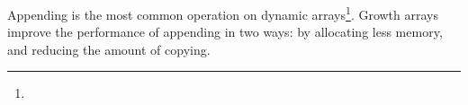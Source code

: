 \descriptn

Appending is the most common operation on dynamic arrays\footnote{}. Growth arrays improve the performance of appending in two ways: by allocating less memory, and reducing the amount of copying.